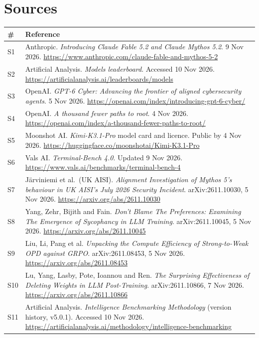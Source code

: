 \documentclass[11pt,a4paper]{article}
\begin{document}
\section{Sources}
{\footnotesize
\begin{tabularx}{\textwidth}{@{}l X@{}}
\toprule
\textbf{\#} & \textbf{Reference} \\
\midrule
S1  & Anthropic. \emph{Introducing Claude Fable 5.2 and Claude Mythos 5.2}. 9 Nov 2026. \url{https://www.anthropic.com/claude-fable-and-mythos-5-2} \\
S2  & Artificial Analysis. \emph{Models leaderboard}. Accessed 10 Nov 2026. \url{https://artificialanalysis.ai/leaderboards/models} \\
S3  & OpenAI. \emph{GPT-6 Cyber: Advancing the frontier of aligned cybersecurity agents}. 5 Nov 2026. \url{https://openai.com/index/introducing-gpt-6-cyber/} \\
S4  & OpenAI. \emph{A thousand fewer paths to root}. 4 Nov 2026. \url{https://openai.com/index/a-thousand-fewer-paths-to-root/} \\
S5  & Moonshot AI. \emph{Kimi-K3.1-Pro} model card and licence. Public by 4 Nov 2026. \url{https://huggingface.co/moonshotai/Kimi-K3.1-Pro} \\
S6  & Vals AI. \emph{Terminal-Bench 4.0}. Updated 9 Nov 2026. \url{https://www.vals.ai/benchmarks/terminal-bench-4} \\
S7  & Järviniemi et al.\ (UK AISI). \emph{Alignment Investigation of Mythos 5's behaviour in UK AISI's July 2026 Security Incident}. arXiv:2611.10030, 5 Nov 2026. \url{https://arxiv.org/abs/2611.10030} \\
S8  & Yang, Zehr, Bijith and Fain. \emph{Don't Blame The Preferences: Examining The Emergence of Sycophancy in LLM Training}. arXiv:2611.10045, 5 Nov 2026. \url{https://arxiv.org/abs/2611.10045} \\
S9 & Liu, Li, Pang et al. \emph{Unpacking the Compute Efficiency of Strong-to-Weak OPD against GRPO}. arXiv:2611.08453, 5 Nov 2026. \url{https://arxiv.org/abs/2611.08453} \\
S10 & Lu, Yang, Lasby, Pote, Ioannou and Ren. \emph{The Surprising Effectiveness of Deleting Weights in LLM Post-Training}. arXiv:2611.10866, 7 Nov 2026. \url{https://arxiv.org/abs/2611.10866} \\
S11 & Artificial Analysis. \emph{Intelligence Benchmarking Methodology} (version history, v5.0.1). Accessed 10 Nov 2026. \url{https://artificialanalysis.ai/methodology/intelligence-benchmarking} \\

\end{tabularx}}
\end{document}
